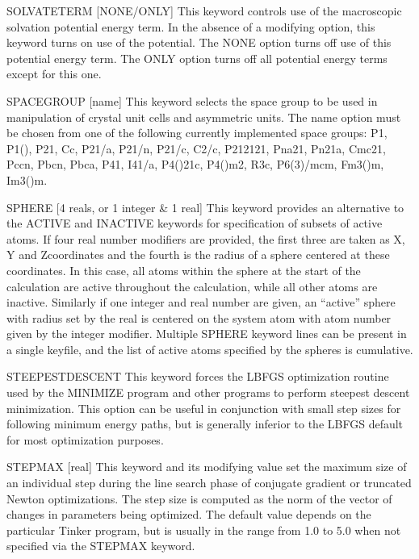 \documentclass[letterpaper,11pt,english]{sphinxmanual}
\begin{document}
SOLVATETERM {[}NONE/ONLY{]}     This keyword controls use of the macroscopic solvation potential energy term. In the absence of a modifying option, this keyword turns on use of the potential. The NONE option turns off use of this potential energy term. The ONLY option turns off all potential energy terms except for this one.

SPACEGROUP {[}name{]}     This keyword selects the space group to be used in manipulation of crystal unit cells and asymmetric units. The name option must be chosen from one of the following currently implemented space groups: P1, P1(\sphinxhyphen{}), P21, Cc, P21/a, P21/n, P21/c, C2/c, P212121, Pna21, Pn21a, Cmc21, Pccn, Pbcn, Pbca, P41, I41/a, P4(\sphinxhyphen{})21c, P4(\sphinxhyphen{})m2, R3c, P6(3)/mcm, Fm3(\sphinxhyphen{})m, Im3(\sphinxhyphen{})m.

SPHERE {[}4 reals, or 1 integer \& 1 real{]}     This keyword provides an alternative to the ACTIVE and INACTIVE keywords for specification of subsets of active atoms. If four real number modifiers are provided, the first three are taken as X\sphinxhyphen{}, Y\sphinxhyphen{} and Z\sphinxhyphen{}coordinates and the fourth is the radius of a sphere centered at these coordinates. In this case, all atoms within the sphere at the start of the calculation are active throughout the calculation, while all other atoms are inactive. Similarly if one integer and real number are given, an “active” sphere with radius set by the real is centered on the system atom with atom number given by the integer modifier. Multiple SPHERE keyword lines can be present in a single keyfile, and the list of active atoms specified by the spheres is cumulative.

STEEPEST\sphinxhyphen{}DESCENT     This keyword forces the L\sphinxhyphen{}BFGS optimization routine used by the MINIMIZE program and other programs to perform steepest descent minimization. This option can be useful in conjunction with small step sizes for following minimum energy paths, but is generally inferior to the L\sphinxhyphen{}BFGS default for most optimization purposes.

STEPMAX {[}real{]}     This keyword and its modifying value set the maximum size of an individual step during the line search phase of conjugate gradient or truncated Newton optimizations. The step size is computed as the norm of the vector of changes in parameters being optimized. The default value depends on the particular Tinker program, but is usually in the range from 1.0 to 5.0 when not specified via the STEPMAX keyword.
\end{document}
